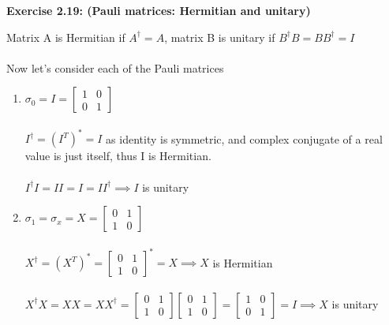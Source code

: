 \documentclass{article}
\begin{document}
\begin{framed}
    \noindent \textbf{Exercise 2.19: (Pauli matrices: Hermitian and unitary)}
    
    \medskip
    Matrix A is Hermitian if $A^{\dagger} = A$, matrix B is unitary if $B^{\dagger}B = BB^{\dagger} = I$ \\\\
    Now let's consider each of the Pauli matrices 
    \begin{enumerate}
        \item $\sigma_0 = I = \begin{bmatrix} 1 & 0 \\ 0 & 1 \end{bmatrix}$\\\\
        $I^{\dagger} = (I^{T})^{*} = I $ as identity is symmetric, and complex conjugate of a real value is just itself, thus I is Hermitian. \\\\
        $I^{\dagger}I = II = I = II^{\dagger} \implies I$ is unitary

        \item $\sigma_1=\sigma_x=X = \begin{bmatrix} 0 & 1 \\ 1 & 0 \end{bmatrix}$\\\\
        $X^{\dagger} = (X^{T})^* = \begin{bmatrix} 0 & 1 \\ 1 & 0 \end{bmatrix}^{*} = X \implies X$ is Hermitian\\\\
        $X^{\dagger}X = XX = XX^{\dagger} = \begin{bmatrix} 0 & 1 \\ 1 & 0 \end{bmatrix} \begin{bmatrix} 0 & 1 \\ 1 & 0 \end{bmatrix} = \begin{bmatrix} 1 & 0 \\ 0 & 1 \end{bmatrix} = I \implies X$ is unitary

        


\end{enumerate}
\end{framed}
\end{document}
